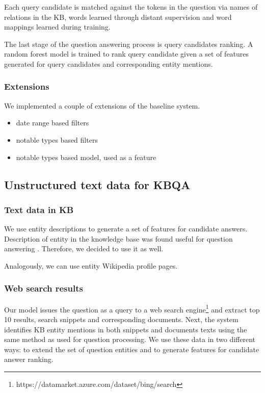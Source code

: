 Each query candidate is matched against the tokens in the question via names of relations in the KB, words learned through distant supervision and word mappings learned during training.

The last stage of the question answering process is query candidates ranking.
A random forest model is trained to rank query candidate given a set of features generated for query candidates and corresponding entity mentions.


\subsubsection{Extensions}
We implemented a couple of extensions of the baseline system.

\begin{itemize}
\item date range based filters
\item notable types based filters
\item notable types based model, used as a feature
\end{itemize}

\subsection{Unstructured text data for KBQA}

\subsubsection{Text data in KB}
We use entity descriptions to generate a set of features for candidate answers.
Description of entity in the knowledge base was found useful for question answering \cite{Sun:2015:ODQ:2736277.2741651}.
Therefore, we decided to use it as well.

Analogously, we can use entity Wikipedia profile pages.

\subsubsection{Web search results}
\label{section:method:web}

Our model issues the question as a query to a web search engine\footnote{https://datamarket.azure.com/dataset/bing/search} and extract top 10 results, \ie search snippets and corresponding documents.
Next, the system identifies KB entity mentions in both snippets and documents texts using the same method as used for question processing.
We use these data in two different ways: to extend the set of question entities and to generate features for candidate answer ranking.

